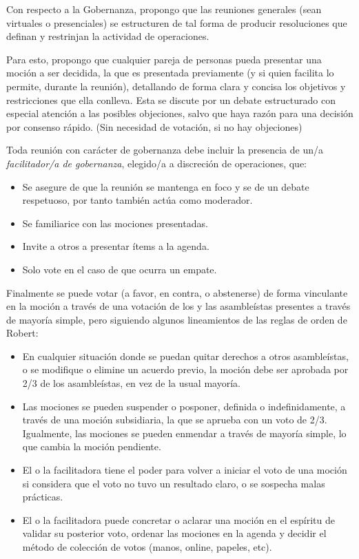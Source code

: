 \documentclass[justified]{tufte-handout} %
\begin{document}
Con respecto a la Gobernanza, propongo que las reuniones generales (sean virtuales o presenciales) se estructuren de tal forma de producir resoluciones que definan y restrinjan la actividad de operaciones.

Para esto, propongo que cualquier pareja de personas pueda presentar una moción a ser decidida, la que es presentada previamente (y si quien facilita lo permite, durante la reunión), detallando de forma clara y concisa los objetivos y restricciones que ella conlleva. Esta se discute por un debate estructurado con especial atención a las posibles objeciones, salvo que haya razón para una decisión por consenso rápido. (Sin necesidad de votación, si no hay objeciones)

Toda reunión con carácter de gobernanza debe incluir la presencia de un/a \textit{facilitador/a de gobernanza}, elegido/a a discreción de operaciones, que:

\begin{itemize}
	\item Se asegure de que la reunión se mantenga en foco y se de un debate respetuoso, por tanto también actúa como moderador.
	\item Se familiarice con las mociones presentadas.
	\item Invite a otros a presentar ítems a la agenda.
	\item Solo vote en el caso de que ocurra un empate.
\end{itemize}

Finalmente se puede votar (a favor, en contra, o abstenerse) de forma vinculante en la moción a través de una votación de los y las asambleístas presentes a través de mayoría simple, pero siguiendo algunos lineamientos de las reglas de orden de Robert\cite{robertrules}:
\begin{itemize}
	\item En cualquier situación donde se puedan quitar derechos a otros asambleístas, o se modifique o elimine un acuerdo previo, la moción debe ser aprobada por 2/3 de los asambleístas, en vez de la usual mayoría.
	\item Las mociones se pueden suspender o posponer, definida o indefinidamente, a través de una moción subsidiaria, la que se aprueba con un voto de 2/3. Igualmente, las mociones se pueden enmendar a través de mayoría simple, lo que cambia la moción pendiente.
	\item El o la facilitadora tiene el poder para volver a iniciar el voto de una moción si considera que el voto no tuvo un resultado claro, o se sospecha malas prácticas.
	\item El o la facilitadora puede concretar o aclarar una moción en el espíritu de validar su posterior voto, ordenar las mociones en la agenda y decidir el método de colección de votos (manos, online, papeles, etc).
\end{itemize}
\end{document}
